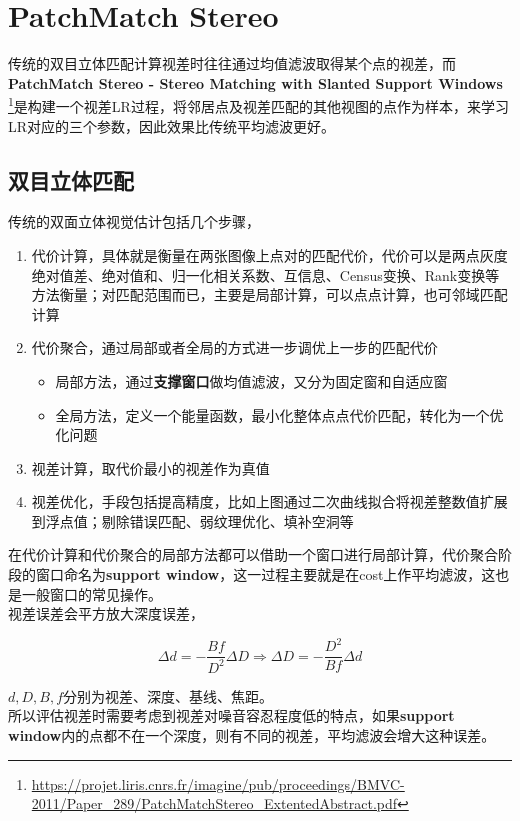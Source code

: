 \section{PatchMatch Stereo}

传统的双目立体匹配计算视差时往往通过均值滤波取得某个点的视差，而
\textbf{PatchMatch Stereo - Stereo Matching with Slanted Support Windows}\protect
\footnote{\url{https://projet.liris.cnrs.fr/imagine/pub/proceedings/BMVC-2011/Paper_289/PatchMatchStereo_ExtentedAbstract.pdf}}是构建一个视差LR过程，将邻居点及视差匹配的其他视图的点作为样本，来学习LR对应的三个参数，因此效果比传统平均滤波更好。

\subsection{双目立体匹配}
传统的双面立体视觉估计包括几个步骤，
\begin{enumerate}
	\item 代价计算，具体就是衡量在两张图像上点对的匹配代价，代价可以是两点灰度绝对值差、绝对值和、归一化相关系数、互信息、Census变换、Rank变换等方法衡量；对匹配范围而已，主要是局部计算，可以点点计算，也可邻域匹配计算
	\item 代价聚合，通过局部或者全局的方式进一步调优上一步的匹配代价
		\begin{itemize}
			\item 局部方法，通过\textbf{支撑窗口}做均值滤波，又分为固定窗和自适应窗
			\item 全局方法，定义一个能量函数，最小化整体点点代价匹配，转化为一个优化问题
		\end{itemize}
	\item 视差计算，取代价最小的视差作为真值
	\item 视差优化，手段包括提高精度，比如上图通过二次曲线拟合将视差整数值扩展到浮点值；剔除错误匹配、弱纹理优化、填补空洞等
\end{enumerate}

在代价计算和代价聚合的局部方法都可以借助一个窗口进行局部计算，代价聚合阶段的窗口命名为\textbf{support window}，这一过程主要就是在cost上作平均滤波，这也是一般窗口的常见操作。\\

视差误差会平方放大深度误差，

$$
	\Delta d= -\frac{Bf}{D^2}\Delta D \Rightarrow \Delta D = -\frac{D^2}{Bf}\Delta d
$$

$d,D,B,f$分别为视差、深度、基线、焦距。\\

所以评估视差时需要考虑到视差对噪音容忍程度低的特点，如果\textbf{support window}内的点都不在一个深度，则有不同的视差，平均滤波会增大这种误差。\\

